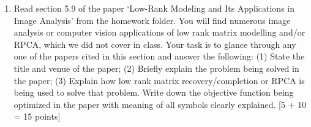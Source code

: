 \documentclass[11pt]{article}
\begin{document}
\begin{enumerate}
\item Read section 5.9 of the paper `Low-Rank Modeling and Its Applications in Image Analysis' from the homework folder. You will find numerous image analysis or computer vision applications of low rank matrix modelling and/or RPCA, which we did not cover in class. Your task is to glance through any one of the papers cited in this section and answer the following: (1) State the title and venue of the paper; (2) Briefly explain the problem being solved in the paper; (3) Explain how low rank matrix recovery/completion or RPCA is being used to solve that problem. Write down the objective function being optimized in the paper with meaning of all symbols clearly explained. \textsf{[5 + 10 = 15 points]}

\end{enumerate}
\end{document}
